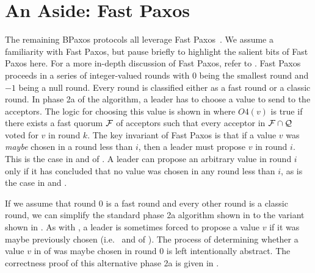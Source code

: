 \section{An Aside: Fast Paxos}


The remaining BPaxos protocols all leverage Fast Paxos~\cite{lamport2006fast}.
We assume a familiarity with Fast Paxos, but pause briefly to highlight the
salient bits of Fast Paxos here. For a more in-depth discussion of Fast Paxos,
refer to .
%
Fast Paxos proceeds in a series of integer-valued rounds with $0$ being the
smallest round and $-1$ being a null round. Every round is classified either as
a fast round or a classic round. In phase 2a of the algorithm, a leader has to
choose a value to send to the acceptors. The logic for choosing this value is
shown in  where $O4(v)$ is true if there exists a fast
quorum $\mathcal{F}$ of acceptors such that every acceptor in $\mathcal{F} \cap
\mathcal{Q}$ voted for $v$ in round $k$.
%
The key invariant of Fast Paxos is that if a value $v$ was \emph{maybe} chosen
in a round less than $i$, then a leader must propose $v$ in round $i$. This is
the case in  and  of
. A leader can propose an arbitrary value in round $i$ only
if it has concluded that no value was chosen in any round less than $i$, as is
the case in  and .

If we assume that round $0$ is a fast round and every other round is a classic
round, we can simplify the standard phase 2a algorithm shown in
 to the variant shown in . As with
, a leader is sometimes forced to propose a value $v$ if it
was maybe previously chosen (i.e.\  and
 of ). The process of
determining whether a value $v$ in  of
 was maybe chosen in round $0$ is left
intentionally abstract. The correctness proof of this alternative phase 2a is
given in .
